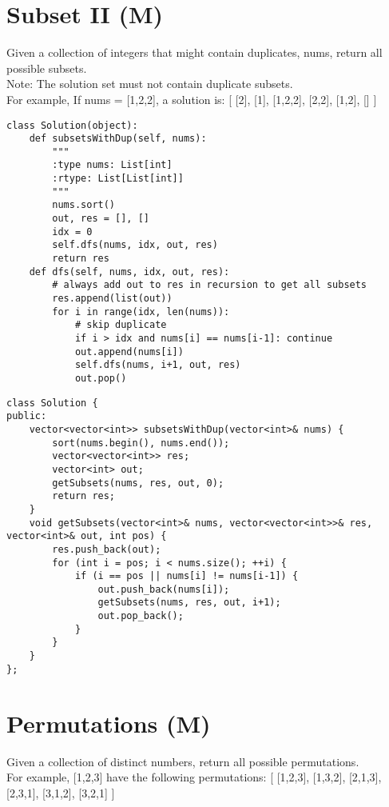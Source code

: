 \section{Subset II (M)}
Given a collection of integers that might contain duplicates, nums, return all possible subsets.\\
Note: The solution set must not contain duplicate subsets.\\
For example,
If nums = [1,2,2], a solution is:
[
  [2],
  [1],
  [1,2,2],
  [2,2],
  [1,2],
  []
]\\

\begin{lstlisting}
class Solution(object):
    def subsetsWithDup(self, nums):
        """
        :type nums: List[int]
        :rtype: List[List[int]]
        """
        nums.sort()
        out, res = [], []
        idx = 0
        self.dfs(nums, idx, out, res)
        return res
    def dfs(self, nums, idx, out, res):
        # always add out to res in recursion to get all subsets
        res.append(list(out))
        for i in range(idx, len(nums)):
            # skip duplicate
            if i > idx and nums[i] == nums[i-1]: continue
            out.append(nums[i])
            self.dfs(nums, i+1, out, res)
            out.pop()
\end{lstlisting}

\begin{lstlisting}
class Solution {
public:
    vector<vector<int>> subsetsWithDup(vector<int>& nums) {
        sort(nums.begin(), nums.end());
        vector<vector<int>> res;
        vector<int> out;
        getSubsets(nums, res, out, 0);
        return res;
    }
    void getSubsets(vector<int>& nums, vector<vector<int>>& res, vector<int>& out, int pos) {
        res.push_back(out);
        for (int i = pos; i < nums.size(); ++i) {
            if (i == pos || nums[i] != nums[i-1]) {
                out.push_back(nums[i]);
                getSubsets(nums, res, out, i+1);
                out.pop_back();
            }
        }
    }
};
\end{lstlisting}


\section{Permutations (M)}
Given a collection of distinct numbers, return all possible permutations. \\

For example,
[1,2,3] have the following permutations: [ [1,2,3], [1,3,2], [2,1,3], [2,3,1], [3,1,2], [3,2,1] ]\\

